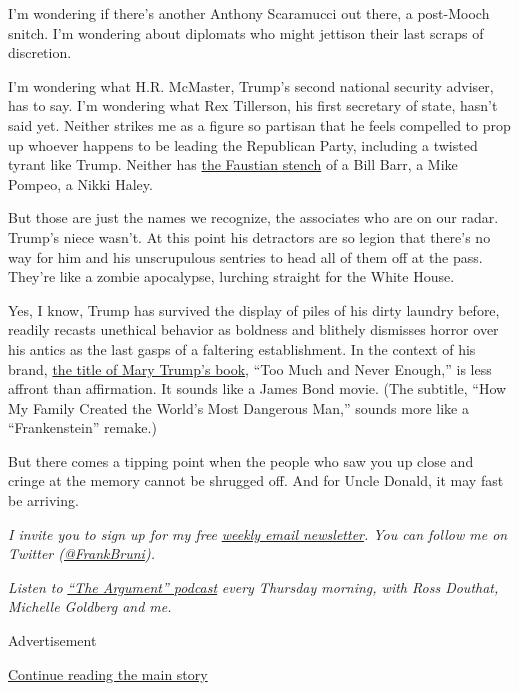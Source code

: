 I'm wondering if there's another Anthony Scaramucci out there, a
post-Mooch snitch. I'm wondering about diplomats who might jettison
their last scraps of discretion.

I'm wondering what H.R. McMaster, Trump's second national security
adviser, has to say. I'm wondering what Rex Tillerson, his first
secretary of state, hasn't said yet. Neither strikes me as a figure so
partisan that he feels compelled to prop up whoever happens to be
leading the Republican Party, including a twisted tyrant like Trump.
Neither has
\href{https://www.nytimes3xbfgragh.onion/2019/10/05/opinion/sunday/pompeo-trump.html}{the
Faustian stench} of a Bill Barr, a Mike Pompeo, a Nikki Haley.

But those are just the names we recognize, the associates who are on our
radar. Trump's niece wasn't. At this point his detractors are so legion
that there's no way for him and his unscrupulous sentries to head all of
them off at the pass. They're like a zombie apocalypse, lurching
straight for the White House.

Yes, I know, Trump has survived the display of piles of his dirty
laundry before, readily recasts unethical behavior as boldness and
blithely dismisses horror over his antics as the last gasps of a
faltering establishment. In the context of his brand,
\href{https://www.nytimes3xbfgragh.onion/2020/06/15/books/mary-trump-book.html}{the
title of Mary Trump's book}, ``Too Much and Never Enough,'' is less
affront than affirmation. It sounds like a James Bond movie. (The
subtitle, ``How My Family Created the World's Most Dangerous Man,''
sounds more like a ``Frankenstein'' remake.)

But there comes a tipping point when the people who saw you up close and
cringe at the memory cannot be shrugged off. And for Uncle Donald, it
may fast be arriving.

\emph{I invite you to sign up for my free}
\href{https://www.nytimes3xbfgragh.onion/newsletters/frank-bruni}{\emph{weekly
email newsletter}}\emph{. You can follow me on Twitter
(}\href{https://twitter.com/FrankBruni}{\emph{@FrankBruni}}\emph{).}

\emph{Listen to}
\href{https://www.nytimes3xbfgragh.onion/column/the-argument}{\emph{``The
Argument'' podcast}} \emph{every Thursday morning, with Ross Douthat,
Michelle Goldberg and me.}

Advertisement

\protect\hyperlink{after-bottom}{Continue reading the main story}

